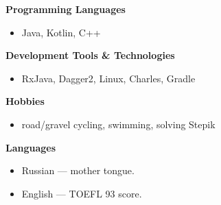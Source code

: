 \documentclass[11pt]{article}
\newcommand\CvBigSkipLength{1em}
\newcommand\CvSkip[1]{\vspace{#1}}
\newcommand\CvBigSkip{\CvSkip{\CvBigSkipLength}}
\newcommand\CvSectionHeader[1]{\CvBigSkip\textbf{#1}\CvBigSkip}
\begin{document}
	\begin{minipage}[t]{.5\linewidth}
		\CvSectionHeader{Programming Languages}
		
		\begin{itemize}
			\item Java, Kotlin, C++
		\end{itemize}
		
		\CvSectionHeader{Development Tools \& Technologies}
		
		\begin{itemize}
			\item RxJava, Dagger2, Linux, Charles, Gradle
		\end{itemize}
		
		\CvSectionHeader{Hobbies}
		
		\begin{itemize}
			\item road/gravel cycling, swimming, solving Stepik
		\end{itemize}
	\end{minipage}
	\begin{minipage}[t]{.5\linewidth}
		\CvSectionHeader{Languages}
		
		\begin{itemize}
			\item Russian --- mother tongue.
			\item English --- TOEFL 93 score.
		\end{itemize}
		
		
	\end{minipage}
	
\end{document}
